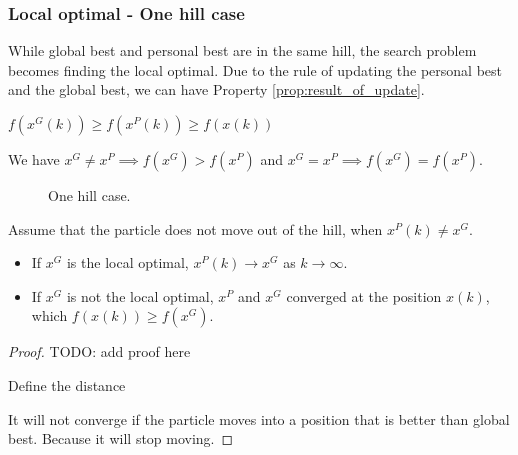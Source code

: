 \subsubsection{Local optimal - One hill case}

While global best and personal best are in the same hill, the search problem becomes finding the local optimal.
Due to the rule of updating the personal best and the global best, we can have Property \ref{prop:result_of_update}.

\begin{property}
\label{prop:result_of_update}
$ f(x^{G}(k)) \geq f(x^{P}(k)) \geq f(x(k)) $
\end{property}

We have $ x^{G} \neq x^{P} \implies f(x^{G}) > f(x^{P}) $ and $ x^{G} = x^{P} \implies f(x^{G}) = f(x^{P}) $.

\begin{figure}
\centering
{}
\caption{One hill case.}
\label{fig:one_hill_case}
\end{figure}

\begin{lemma}
\label{lem:one_hill:xp_to_xg}
Assume that the particle does not move out of the hill, when $ x^{P}(k) \neq x^{G} $.
\begin{itemize}
\item If $ x^{G} $ is the local optimal, $ x^{P}(k) \rightarrow x^{G} $ as $ k \rightarrow \infty $.
\item If $ x^{G} $ is not the local optimal, $ x^{P} $ and $ x^{G} $ converged at the position $ x(k) $, which $ f(x(k)) \geq f(x^{G}) $.
\end{itemize}
\begin{proof}
TODO: add proof here

Define the distance

It will not converge if the particle moves into a position that is better than global best.
Because it will stop moving. 
\end{proof}
\end{lemma}

